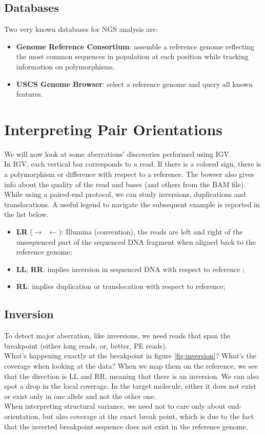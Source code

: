 \subsection{Databases}
Two very known databases for NGS analysis are:
\begin{itemize}
\item \textbf{Genome Reference Consortium}: assemble a reference genome reflecting the most common sequences in population at each position while tracking information on polymorphisms.
\item \textbf{USCS Genome Browser}: select a reference genome and query all known features.
\end{itemize}

\section{Interpreting Pair Orientations}
We will now look at some aberrations' discoveries performed using IGV.\\
In IGV, each vertical bar corresponds to a read.
If there is a colored sign, there is a polymorphism or difference with respect to a reference.
The bowser also gives info about the quality of the read and bases (and others from the BAM file).\\
While using a paired-end protocol, we can study inversions, duplications and translocations. A useful legend to navigate the subsequent example is reported in the list below.
\begin{itemize}
\item \textbf{LR} ($\rightarrow \, \, \, \leftarrow$): Illumina (convention), the reads are left and right of the unsequenced part of the sequenced DNA fragment when aligned back to the reference genome;
\item \textbf{LL}, \textbf{RR}: implies inversion in sequenced DNA with respect to reference ;
\item \textbf{RL}: implies duplication or translocation with respect to reference;

\end{itemize}

\subsection{Inversion}
To detect major aberration, like inversions, we need reads that span the breakpoint (either long reads, or, better, PE reads). \\
What's happening exactly at the breakpoint in figure \ref{fig:inversion}? What's the coverage when looking at the data?  When we map them on the reference, we see that the direction is LL and RR, meaning that there is an inversion.
We can also spot a drop in the local coverage.
In the target molecule, either it does not exist or exist only in one allele and not the other one. \\
When interpreting structural variance, we need not to care only about end-orientation, but also coverage at the exact break point, which is due to the fact that the inverted breakpoint sequence does not exist in the reference genome.


